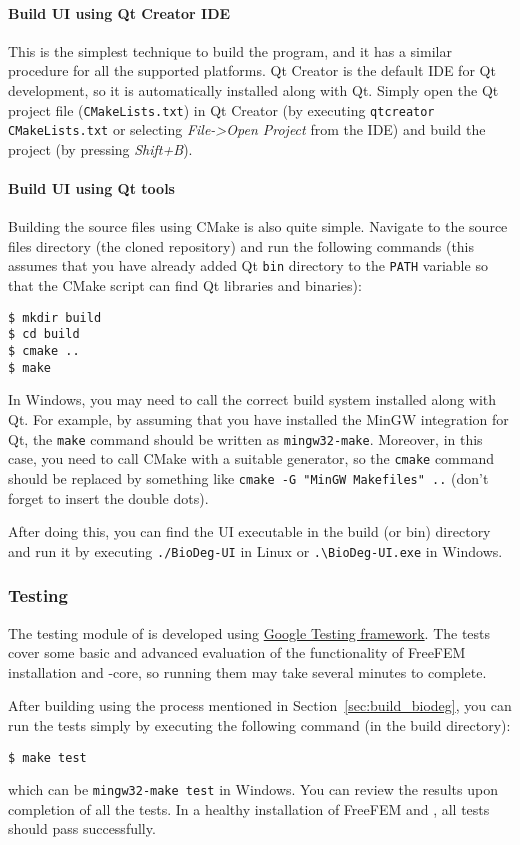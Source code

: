\paragraph{Build \biodeg{} UI using Qt Creator IDE}

This is the simplest technique to build the program, and it has a similar procedure for all the supported platforms. Qt Creator is the default IDE for Qt development, so it is automatically installed along with Qt. Simply open the Qt project file (\verb|CMakeLists.txt|) in Qt Creator (by executing \verb|qtcreator CMakeLists.txt| or selecting \textit{File->Open Project} from the IDE) and build the project (by pressing \textit{Shift+B}).

\paragraph{Build \biodeg{} UI using Qt tools}

Building the source files using CMake is also quite simple. Navigate to the source files directory (the cloned repository) and run the following commands (this assumes that you have already added Qt \verb|bin| directory to the \verb|PATH| variable so that the CMake script can find Qt libraries and binaries):

\begin{verbatim}
$ mkdir build
$ cd build
$ cmake ..
$ make
\end{verbatim}

In Windows, you may need to call the correct build system installed along with Qt. For example, by assuming that you have installed the MinGW integration for Qt, the \verb|make| command should be written as \verb|mingw32-make|. Moreover, in this case, you need to call CMake with a suitable generator, so the \verb|cmake| command should be replaced by something like \verb|cmake -G "MinGW Makefiles" ..| (don't forget to insert the double dots).

After doing this, you can find the \biodeg{} UI executable in the build (or bin) directory and run it by executing \verb|./BioDeg-UI| in Linux or \verb|.\BioDeg-UI.exe| in Windows.

\subsubsection{Testing \biodeg{}}

The testing module of \biodeg{} is developed using \href{https://github.com/google/googletest}{Google Testing framework}. The tests cover some basic and advanced evaluation of the functionality of FreeFEM installation and \biodeg{}-core, so running them may take several minutes to complete. 

After building \biodeg{} using the process mentioned in Section~\ref{sec:build_biodeg}, you can run the tests simply by executing the following command (in the build directory):

\begin{verbatim}
$ make test
\end{verbatim}
which can be \verb|mingw32-make test| in Windows. You can review the results upon completion of all the tests. In a healthy installation of FreeFEM and \biodeg{}, all tests should pass successfully. 